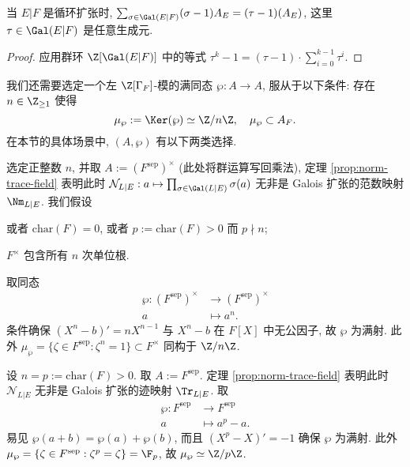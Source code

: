 \begin{lemma}\label{prop:H-minus-1-cyclic}
	当 $E|F$ 是循环扩张时, $\sum_{\sigma \in \Gal(E|F)} (\sigma-1)A_E = (\tau-1)(A_E)$, 这里 $\tau \in \Gal(E|F)$ 是任意生成元.
\end{lemma}
\begin{proof}
	应用群环 $\Z[\Gal(E|F)]$ 中的等式 $\tau^k - 1 =  (\tau-1) \cdot \sum_{i=0}^{k-1} \tau^i$.
\end{proof}

我们还需要选定一个左 $\Z[\Gamma_F]$-模的满同态 $\wp: A \to A$, 服从于以下条件: 存在 $n \in \Z_{\geq 1}$ 使得
\[ \mu_\wp := \Ker(\wp) \simeq \Z/n\Z, \quad \mu_\wp \subset A_F. \]
在本节的具体场景中, $(A, \wp)$ 有以下两类选择.

\begin{example}[经典 Kummer 理论]\label{eg:Kummer-theory} 
	选定正整数 $n$, 并取 $A := (F^\text{sep})^\times$ (此处将群运算写回乘法), 定理 \ref{prop:norm-trace-field} 表明此时 $\mathcal{N}_{L|E}: a \mapsto \prod_{\sigma \in \Gal(L|E)} \sigma(a)$ 无非是 Galois 扩张的范数映射 $\Nm_{L|E}$. 我们假设
	\begin{compactitem}
		\item 或者 $\text{char}(F) = 0$, 或者 $p := \text{char}(F) > 0$ 而 $p \nmid n$;
		\item $F^\times$ 包含所有 $n$ 次单位根.
	\end{compactitem}
	取同态
	\begin{align*}
		\wp: (F^{\text{sep}})^\times & \longrightarrow (F^{\text{sep}})^\times \\
		a & \longmapsto a^n.
	\end{align*}
	条件确保 $(X^n-b)' = nX^{n-1}$ 与 $X^n-b$ 在 $F[X]$ 中无公因子, 故 $\wp$ 为满射. 此外 $\mu_\wp = \{\zeta \in F^\text{sep}: \zeta^n = 1 \} \subset F^\times$ 同构于 $\Z/n\Z$.
\end{example}

\begin{example}\label{eg:Artin-Schreier-theory} 
	设 $n = p := \text{char}(F) > 0$. 取 $A := F^\text{sep}$. 定理 \ref{prop:norm-trace-field} 表明此时 $\mathcal{N}_{L|E}$ 无非是 Galois 扩张的迹映射 $\Tr_{L|E}$. 取
	\begin{align*}
		\wp: F^{\text{sep}} & \longrightarrow F^{\text{sep}} \\
		a & \longmapsto a^p - a.
	\end{align*}
	易见 $\wp(a+b)=\wp(a)+\wp(b)$, 而且 $(X^p - X)' = -1$ 确保 $\wp$ 为满射. 此外 $\mu_\wp = \{\zeta \in F^\text{sep}: \zeta^p=\zeta \} = \F_p$, 故 $\mu_\wp \simeq \Z/p\Z$.
\end{example}

